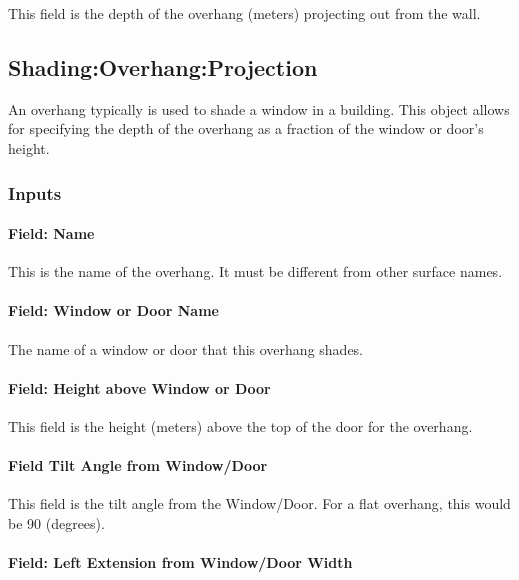 This field is the depth of the overhang (meters) projecting out from the wall.

\subsection{Shading:Overhang:Projection}\label{shadingoverhangprojection}

An overhang typically is used to shade a window in a building. This object allows for specifying the depth of the overhang as a fraction of the window or door's height.

\subsubsection{Inputs}\label{inputs-27-003}

\paragraph{Field: Name}\label{field-name-25-003}

This is the name of the overhang. It must be different from other surface names.

\paragraph{Field: Window or Door Name}\label{field-window-or-door-name-1}

The name of a window or door that this overhang shades.

\paragraph{Field: Height above Window or Door}\label{field-height-above-window-or-door-1}

This field is the height (meters) above the top of the door for the overhang.

\paragraph{Field Tilt Angle from Window/Door}\label{field-tilt-angle-from-windowdoor-1}

This field is the tilt angle from the Window/Door. For a flat overhang, this would be 90 (degrees).

\paragraph{Field: Left Extension from Window/Door Width}\label{field-left-extension-from-windowdoor-width-1}

